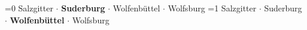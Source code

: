 \begin{titlepage}
\begin{flushleft}
    \end{flushleft}
    \begin{flushright}
    \vfill
    \color{text}\small\textsf{
		\ifnum\value{documentfakultaet}=0
    		Salzgitter $ \cdot $ \textbf{Suderburg} $ \cdot $ Wolfenbüttel $ \cdot $ Wolfsburg
    	\fi\ifnum\value{documentfakultaet}=1
    		Salzgitter $ \cdot $ Suderburg $ \cdot $ \textbf{Wolfenbüttel} $ \cdot $ Wolfsburg
    	\fi
    } 
    \end{flushright}
    
\end{titlepage}

\restoregeometry
